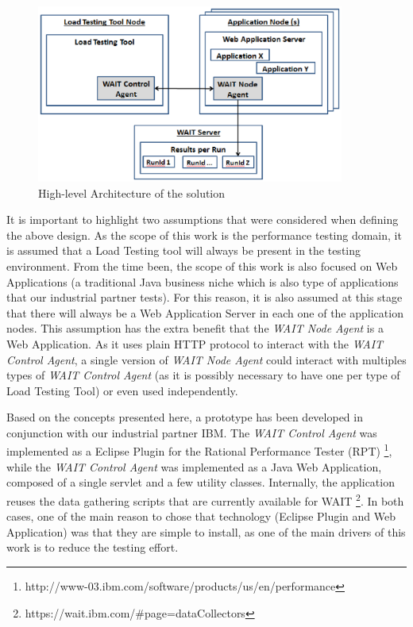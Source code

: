 \documentclass[runningheads,a4paper]{llncs}
\begin{document}
\begin{figure}[!h]
\centering
\includegraphics[totalheight=.3\textheight,width=0.9\textwidth]{architecture_dwait}
\caption{High-level Architecture of the solution}
\label{fig_Arch}
\end{figure}

It is important to highlight two assumptions that were considered when defining
the above design. As the scope of this work is the performance testing domain,
it is assumed that a Load Testing tool will always be present in the
testing environment. From the time been, the scope of this work is also focused
on Web Applications (a traditional Java business niche which is also type of 
applications that our industrial partner tests). For this reason, it is also
assumed at this stage that there will always be a Web Application Server in each
one of the application nodes. This assumption has the extra benefit that the
\emph{WAIT Node Agent} is a Web Application. As it uses plain HTTP protocol
to interact with the \emph{WAIT Control Agent}, a single version of \emph{WAIT
Node Agent} could interact with multiples types of \emph{WAIT Control Agent}
(as it is possibly necessary to have one per type of Load Testing Tool) or even
used independently.

Based on the concepts presented here, a prototype has been developed in
conjunction with our industrial partner IBM. The \emph{WAIT Control Agent} was
implemented as a Eclipse Plugin for the Rational Performance Tester (RPT)
\footnote{http://www-03.ibm.com/software/products/us/en/performance},
while the \emph{WAIT Control Agent} was implemented as a Java Web Application,
composed of a single servlet and a few utility classes. Internally, the
application reuses the data gathering scripts that are currently available for
WAIT \footnote{https://wait.ibm.com/\#page=dataCollectors}. In both cases,
one of the main reason to chose that technology (Eclipse Plugin and Web
Application) was that they are simple to install, as one of the main drivers of
this work is to reduce the testing effort.
\end{document}
